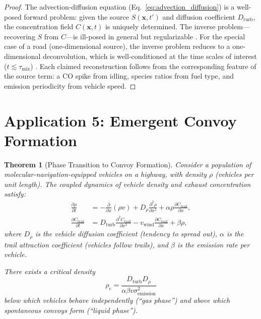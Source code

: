 \documentclass[11pt,twocolumn,a4paper]{article}
\theoremstyle{plain}
\newtheorem{theorem}{Theorem}[section]
\theoremstyle{definition}
\theoremstyle{remark}
\newcommand{\taumix}{\tau_{\mathrm{mix}}}
\newcommand{\Dturb}{D_{\mathrm{turb}}}
\newcommand{\Ctrail}{C_{\mathrm{trail}}}
\newcommand{\rhoc}{\rho_{\mathrm{c}}}
\begin{document}
\begin{proof}
The advection-diffusion equation (Eq.~\eqref{eq:advection_diffusion}) is a well-posed forward problem: given the source $S(\mathbf{x}, t')$ and diffusion coefficient $\Dturb$, the concentration field $C(\mathbf{x}, t)$ is uniquely determined. The inverse problem---recovering $S$ from $C$---is ill-posed in general but regularizable \cite{pasquill1983atmospheric}. For the special case of a road (one-dimensional source), the inverse problem reduces to a one-dimensional deconvolution, which is well-conditioned at the time scales of interest ($t \lesssim \taumix$) \cite{turner1994workbook}. Each claimed reconstruction follows from the corresponding feature of the source term: a CO spike from idling, species ratios from fuel type, and emission periodicity from vehicle speed.
\end{proof}


\section{Application 5: Emergent Convoy Formation}
\label{sec:convoy}

\begin{theorem}[Phase Transition to Convoy Formation]
\label{thm:convoy}
Consider a population of molecular-navigation-equipped vehicles on a highway, with density $\rho$ (vehicles per unit length). The coupled dynamics of vehicle density and exhaust concentration satisfy:
\begin{align}
\frac{\partial \rho}{\partial t} &= -\frac{\partial}{\partial x}(\rho v) + D_\rho \frac{\partial^2 \rho}{\partial x^2} + \alpha \rho \frac{\partial \Ctrail}{\partial x}, \label{eq:rho_pde}\\
\frac{\partial \Ctrail}{\partial t} &= \Dturb \frac{\partial^2 \Ctrail}{\partial x^2} - v_{\mathrm{wind}} \frac{\partial \Ctrail}{\partial x} + \beta \rho, \label{eq:C_pde}
\end{align}
where $D_\rho$ is the vehicle diffusion coefficient (tendency to spread out), $\alpha$ is the trail attraction coefficient (vehicles follow trails), and $\beta$ is the emission rate per vehicle.

There exists a critical density
\begin{equation}
\rhoc = \frac{\Dturb D_\rho}{\alpha \beta v \sigma_{\mathrm{emission}}^2}
\label{eq:rho_c}
\end{equation}
below which vehicles behave independently (``gas phase'') and above which spontaneous convoys form (``liquid phase'').
\end{theorem}
\end{document}
